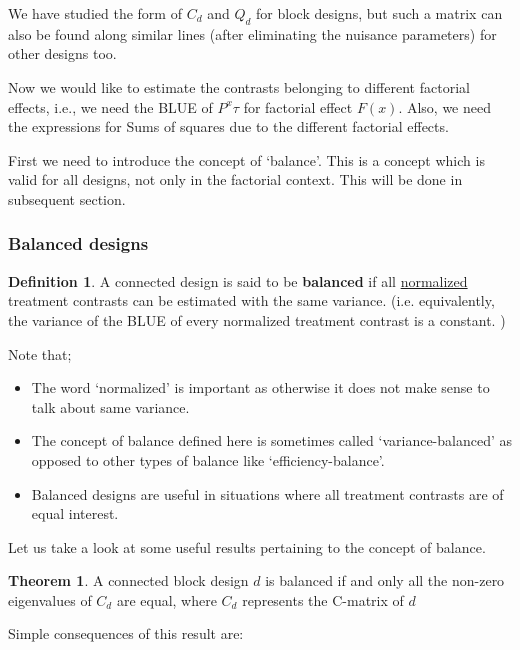 \documentclass[12pt]{article}
\theoremstyle{definition}
\newtheorem{thm}{Theorem}
\newtheorem{defn}{Definition}
\newenvironment{definition}{
\begin{tcolorbox}[colback=green!5!white,colframe=green!75!black, parbox = false]\begin{defn} }{\end{defn}\end{tcolorbox} }
\newenvironment{theorem}{
\begin{tcolorbox}[colback=green!5!white,colframe=green!75!black, parbox = false]\begin{thm} }{\end{thm}\end{tcolorbox} }
\begin{document}
We have studied  the form of $C_d$ and $Q_d$ for block designs, but such a matrix can also be found along similar lines (after eliminating the nuisance parameters) for other designs too.

Now we would like to estimate the contrasts belonging to different factorial effects, i.e., we need the BLUE of $P^x\tau$ for factorial effect $F(x)$. Also, we need the expressions for Sums of squares due to the different factorial effects. 

First we need to  introduce the concept of `balance'. This is a concept which is valid for all designs, not only in the factorial context. This will be done in subsequent section. 



\subsubsection{Balanced designs}

\begin{definition}
     A connected design is said to be \textbf{balanced} if all \underline{normalized} treatment contrasts can be estimated with the same variance. (i.e. equivalently, the variance of the BLUE of every normalized treatment contrast is a constant. )
\end{definition}


Note that; 

\begin{itemize}
	\item The word `normalized' is important as otherwise it does not make sense to talk about same variance. 
	\item The concept of balance defined here is sometimes called `variance-balanced' 
	as opposed to other types of balance like `efficiency-balance'.
	\item Balanced designs are useful in situations where all treatment contrasts are of equal interest.
\end{itemize}

Let us take a look at some useful results pertaining to the concept of balance.

\begin{theorem}
    A connected block design $d$ is balanced if and only all the non-zero eigenvalues of $C_d$ are equal, where $C_d$ represents the  C-matrix of $d$
\end{theorem}
    
Simple consequences of this result are: 
\end{document}
